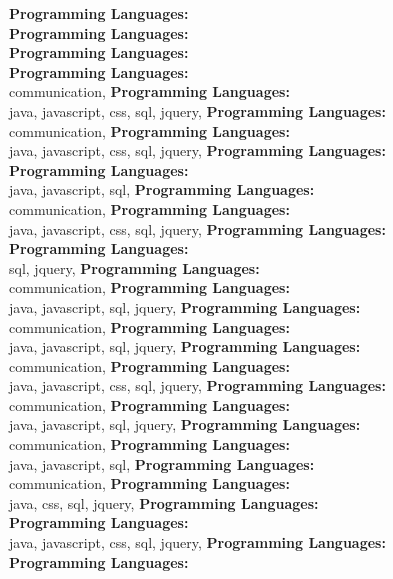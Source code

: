 \textbf{Programming Languages:} \\
\textbf{Programming Languages:} \\
\textbf{Programming Languages:} \\
\textbf{Programming Languages:} \\
communication, \textbf{Programming Languages:} \\
java, javascript, css, sql, jquery, \textbf{Programming Languages:} \\
communication, \textbf{Programming Languages:} \\
java, javascript, css, sql, jquery, \textbf{Programming Languages:} \\
\textbf{Programming Languages:} \\
java, javascript, sql, \textbf{Programming Languages:} \\
communication, \textbf{Programming Languages:} \\
java, javascript, css, sql, jquery, \textbf{Programming Languages:} \\
\textbf{Programming Languages:} \\
sql, jquery, \textbf{Programming Languages:} \\
communication, \textbf{Programming Languages:} \\
java, javascript, sql, jquery, \textbf{Programming Languages:} \\
communication, \textbf{Programming Languages:} \\
java, javascript, sql, jquery, \textbf{Programming Languages:} \\
communication, \textbf{Programming Languages:} \\
java, javascript, css, sql, jquery, \textbf{Programming Languages:} \\
communication, \textbf{Programming Languages:} \\
java, javascript, sql, jquery, \textbf{Programming Languages:} \\
communication, \textbf{Programming Languages:} \\
java, javascript, sql, \textbf{Programming Languages:} \\
communication, \textbf{Programming Languages:} \\
java, css, sql, jquery, \textbf{Programming Languages:} \\
\textbf{Programming Languages:} \\
java, javascript, css, sql, jquery, \textbf{Programming Languages:} \\
\textbf{Programming Languages:} \\
